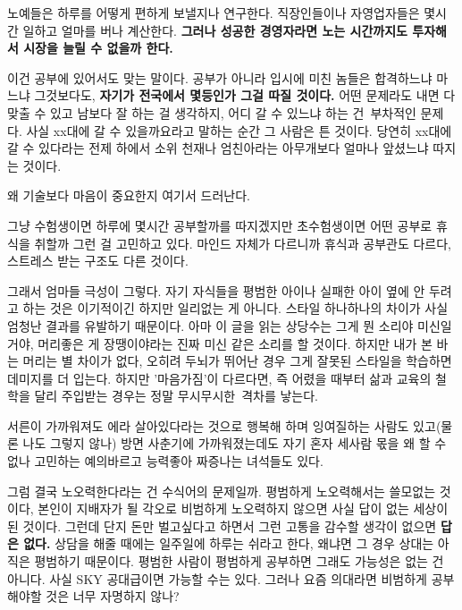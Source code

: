 노예들은 하루를 어떻게 편하게 보낼지나 연구한다.
직장인들이나 자영업자들은 몇시간 일하고 얼마를 버나 계산한다.
\textbf{그러나 성공한 경영자라면 노는 시간까지도 투자해서 시장을 늘릴 수 없을까 한다.}
\vspace{5mm}

이건 공부에 있어서도 맞는 말이다.
공부가 아니라 입시에 미친 놈들은 합격하느냐 마느냐 그것보다도, \textbf{자기가 전국에서 몇등인가 그걸 따질 것이다.}
어떤 문제라도 내면 다 맞출 수 있고 남보다 잘 하는 걸 생각하지, 어디 갈 수 있느냐 하는 건 부차적인 문제다.
사실 xx대에 갈 수 있을까요라고 말하는 순간 그 사람은 튼 것이다.
당연히 xx대에 갈 수 있다라는 전제 하에서 소위 천재나 엄친아라는 아무개보다 얼마나 앞셨느냐 따지는 것이다.
\vspace{5mm}

왜 기술보다 마음이 중요한지 여기서 드러난다.
\vspace{5mm}

그냥 수험생이면 하루에 몇시간 공부할까를 따지겠지만
초수험생이면 어떤 공부로 휴식을 취할까 그런 걸 고민하고 있다.
마인드 자체가 다르니까 휴식과 공부관도 다르다, 스트레스 받는 구조도 다른 것이다.
\vspace{5mm}

그래서 엄마들 극성이 그렇다. 자기 자식들을 평범한 아이나 실패한 아이 옆에 안 두려고 하는 것은 이기적이긴 하지만 일리없는 게 아니다.
스타일 하나하나의 차이가 사실 엄청난 결과를 유발하기 때문이다.
아마 이 글을 읽는 상당수는 그게 뭔 소리야 미신일 거야, 머리좋은 게 장땡이야라는 진짜 미신 같은 소리를 할 것이다.
하지만 내가 본 바는 머리는 별 차이가 없다, 오히려 두뇌가 뛰어난 경우 그게 잘못된 스타일을 학습하면 데미지를 더 입는다.
하지만 '마음가짐'이 다르다면, 즉 어렸을 때부터 삶과 교육의 철학을 달리 주입받는 경우는 정말 무시무시한 격차를 낳는다.
\vspace{5mm}

서른이 가까워져도 에라 살아있다라는 것으로 행복해 하며 잉여질하는 사람도 있고(물론 나도 그렇지 않나)
방면 사춘기에 가까워졌는데도 자기 혼자 세사람 몫을 왜 할 수 없나 고민하는 예의바르고 능력좋아 짜증나는 녀석들도 있다.
\vspace{5mm}

그럼 결국 노오력한다라는 건 수식어의 문제일까.
평범하게 노오력해서는 쓸모없는 것이다, 본인이 지배자가 될 각오로 비범하게 노오력하지 않으면 사실 답이 없는 세상이 된 것이다.
그런데 단지 돈만 벌고싶다고 하면서 그런 고통을 감수할 생각이 없으면 \textbf{답은 없다.}
상담을 해줄 때에는 일주일에 하루는 쉬라고 한다, 왜냐면 그 경우 상대는 아직은 평범하기 때문이다.
평범한 사람이 평범하게 공부하면 그래도 가능성은 없는 건 아니다. 사실 SKY 공대급이면 가능할 수는 있다.
그러나 요즘 의대라면 비범하게 공부해야할 것은 너무 자명하지 않나?
\vspace{5mm}

